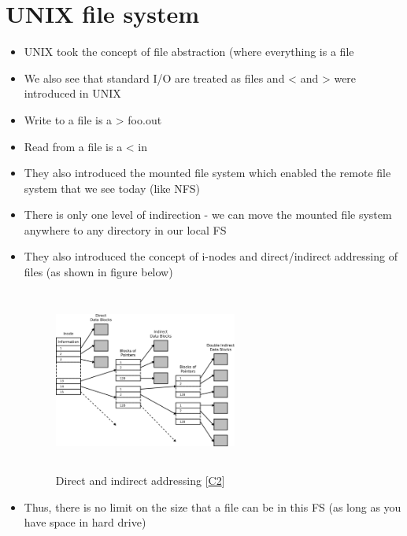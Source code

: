 \documentclass[10pt]{article}
\renewcommand{\cite}[1]{[#1]}
\begin{document}
\section{UNIX file system}
\begin{itemize}
    \item UNIX took the concept of file abstraction (where everything is a file
    \item We also see that standard I/O are treated as files and < and > were introduced in UNIX
    \item Write to a file is a > foo.out
    \item Read from a file is a < in
    \item They also introduced the mounted file system which enabled the remote file system that we see today (like NFS)
    \item There is only one level of indirection - we can move the mounted file system anywhere to any directory in our local FS
    \item They also introduced the concept of i-nodes and direct/indirect addressing of files (as shown in figure below)
    \begin{figure}[H]
\centering
\includegraphics[width=6cm, height=6cm]{address.png}
\caption{Direct and indirect addressing \cite{\href{https://en.wikipedia.org/wiki/Inode_pointer_structure}{C2}}}
\label{fig:3}
\end{figure}
    \item Thus, there is no limit on the size that a file can be in this FS (as long as you have space in hard drive)
\end{itemize}
\end{document}
